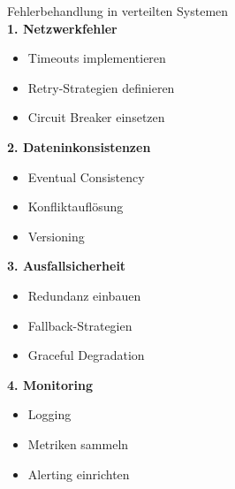 \begin{KR}{Fehlerbehandlung in verteilten Systemen}\\
\textbf{1. Netzwerkfehler}
\begin{itemize}
    \item Timeouts implementieren
    \item Retry-Strategien definieren
    \item Circuit Breaker einsetzen
\end{itemize}

\textbf{2. Dateninkonsistenzen}
\begin{itemize}
    \item Eventual Consistency
    \item Konfliktauflösung
    \item Versioning
\end{itemize}

\textbf{3. Ausfallsicherheit}
\begin{itemize}
    \item Redundanz einbauen
    \item Fallback-Strategien
    \item Graceful Degradation
\end{itemize}

\textbf{4. Monitoring}
\begin{itemize}
    \item Logging
    \item Metriken sammeln
    \item Alerting einrichten
\end{itemize}
\end{KR}

